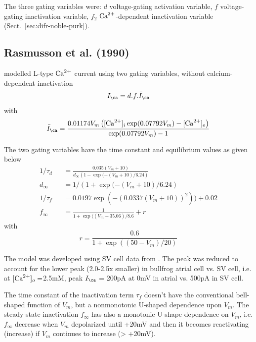 The three gating variables were: $d$ voltage-gating
activation variable, $f$ voltage-gating inactivation variable, $f_2$
${\text{Ca}^{2+}}$-dependent inactivation variable \citep{difrancesco1985mcea}
(Sect.~\ref{sec:difr-noble-purk}).

\subsection{Rasmusson et al. (1990)}
\label{sec:LCC_Rasmusson1990}

\citep{rasmusson1990mme, rasmusson1990mms} modelled L-type ${\text{Ca}^{2+}}$ current using
two gating variables, without calcium-dependent inactivation
\begin{equation}
I_\ca = d.f.\bar{I}_\ca
\end{equation}
with
\begin{equation}
\bar{I}_\ca = \frac{0.01174 V_m \left( [\Ca]_i \exp(0.07792 V_m) -
[\Ca]_o \right)}{\exp(0.07792 V_m) - 1}
\end{equation}

The two gating variables have the time constant and equilibrium values as given
below
\begin{eqnarray}
1/\tau_d &&= \frac{0.035 (V_m + 10)}{d_\infty \left( 1- \exp (- (V_m + 10)
/ 6.24\right)} \\
d_\infty &&= 1/ \left(1+ \exp(- (V_m + 10) / 6.24 \right) \\
1/\tau_f &&=  0.0197 \exp(-(0.0337(V_m+10))^2)) + 0.02 \\
f_\infty &&= \frac{1}{1+ \exp((V_m + 35.06)/8.6} + r 
\end{eqnarray}
with 
\begin{equation}
r = \frac{0.6}{1 + \exp((50-V_m)/20)}
\end{equation}

The model was developed using SV cell data from \citep{Hume1981}. The peak was
reduced to account for the lower peak (2.0-2.5x smaller) in bullfrog atrial cell
vs. SV cell, i.e. at $[{\text{Ca}^{2+}}]_o=$2.5mM, peak $I_\ca$ = 200pA  at 0mV in atrial vs.
500pA in SV cell. 

The time constant of the inactivation term $\tau_f$ doesn't have the
conventional bell-shaped function of $V_m$, but a nonmonotonic U-shaped
dependence upon $V_m$. The steady-state inactivation $f_\infty$ has also a
monotonic U-shape dependence on $V_m$, i.e. $f_\infty$ decrease when $V_m$
depolarized until +20mV and then it becomes reactivating (increase) if $V_m$
continues to increase (> +20mV).




